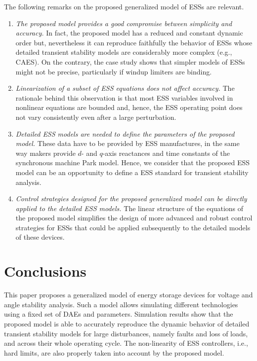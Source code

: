 \documentclass[journal, a4paper]{IEEEtran}
\begin{document}
The following remarks on the proposed generalized model of ESSs are
relevant.

\begin{enumerate}
\item \textit{The proposed model provides a good compromise bet\-ween
    simplicity and accuracy.} In fact, the proposed model has a
  reduced and constant dynamic order but, nevertheless it can
  reproduce faithfully the behavior of ESSs whose detailed
  transient stability models are
  considerably more complex (e.g., CAES).  On the contrary, the case
  study shows that simpler models of ESSs might not be precise,
  particularly if windup limiters are binding.
\item \textit{Linearization of a subset of ESS equations does not
  affect accuracy.}  The rationale behind this observation is that
  most ESS variables involved in nonlinear equations are bounded
  and, hence, the ESS operating point does not vary consistently even
  after a large perturbation.
\item \textit{Detailed ESS models are needed to define the para\-meters
  of the proposed model.}  These data have to be provided by ESS
  manufactures, in the same way makers provide $d$- and $q$-axis
  reactances and time constants of the synchronous machine Park model.
  Hence, we consider that the proposed ESS model can be an opportunity
  to define a ESS standard for transient stability analysis.
\item \textit{Control strategies designed for the proposed generalized model
	can be directly applied to the detailed ESS models.} The linear structure of
	the equations of the proposed model simplifies the design of more advanced 
	and robust control strategies for ESSs that could be applied subsequently
	to the detailed models of these devices.
\end{enumerate}



\section{Conclusions}
\label{sec:conclu}

This paper proposes a generalized model of energy storage devices for
voltage and angle stability analysis.  Such a model allows simulating
different technologies using a fixed set of DAEs and parameters.
Simulation results show that the proposed model is able to accurately
reproduce the dynamic behavior of detailed transient
stability models for large disturbances, namely faults
and loss of loads, and across their whole operating cycle. 
The non-linearity of ESS controllers, i.e., hard
limits, are also properly taken into account by the proposed model.
\end{document}
